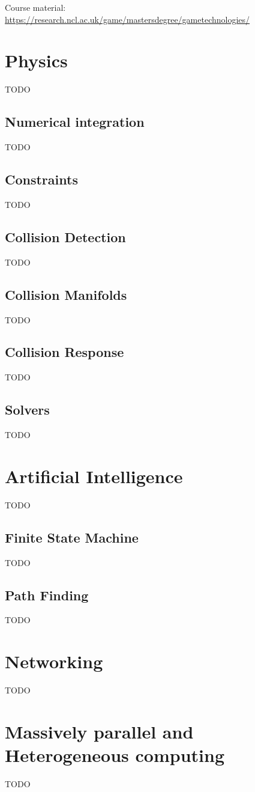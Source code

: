 \documentclass[a4paper]{article}
\begin{document}
\tableofcontents

\vfill
Course material:
\url{https://research.ncl.ac.uk/game/mastersdegree/gametechnologies/}

\section{Physics}

TODO

\subsection{Numerical integration}

TODO

\subsection{Constraints}

TODO

\subsection{Collision Detection}

TODO

\subsection{Collision Manifolds}

TODO

\subsection{Collision Response}

TODO

\subsection{Solvers}

TODO

\section{Artificial Intelligence}

TODO

\subsection{Finite State Machine}

TODO

\subsection{Path Finding}

TODO

\section{Networking}

TODO

\section{Massively parallel and Heterogeneous computing}

TODO
\end{document}
